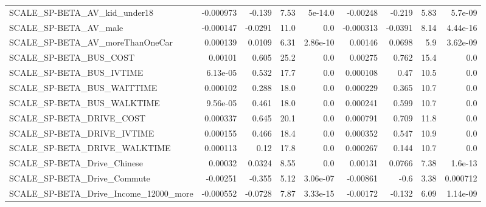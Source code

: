 \begin{tabular}{lrrrrrrrr}
SCALE\_SP-BETA\_AV\_kid\_under18                       &   -0.000973 &       -0.139 &     7.53 &  5e-14.0 &   -0.00248 &      -0.219 &         5.83 &       5.7e-09 \\
SCALE\_SP-BETA\_AV\_male                              &   -0.000147 &      -0.0291 &     11.0 &      0.0 &  -0.000313 &     -0.0391 &         8.14 &      4.44e-16 \\
SCALE\_SP-BETA\_AV\_moreThanOneCar                    &    0.000139 &       0.0109 &     6.31 & 2.86e-10 &    0.00146 &      0.0698 &          5.9 &      3.62e-09 \\
SCALE\_SP-BETA\_BUS\_COST                             &     0.00101 &        0.605 &     25.2 &      0.0 &    0.00275 &       0.762 &         15.4 &           0.0 \\
SCALE\_SP-BETA\_BUS\_IVTIME                           &    6.13e-05 &        0.532 &     17.7 &      0.0 &   0.000108 &        0.47 &         10.5 &           0.0 \\
SCALE\_SP-BETA\_BUS\_WAITTIME                         &    0.000102 &        0.288 &     18.0 &      0.0 &   0.000229 &       0.365 &         10.7 &           0.0 \\
SCALE\_SP-BETA\_BUS\_WALKTIME                         &    9.56e-05 &        0.461 &     18.0 &      0.0 &   0.000241 &       0.599 &         10.7 &           0.0 \\
SCALE\_SP-BETA\_DRIVE\_COST                           &    0.000337 &        0.645 &     20.1 &      0.0 &   0.000791 &       0.709 &         11.8 &           0.0 \\
SCALE\_SP-BETA\_DRIVE\_IVTIME                         &    0.000155 &        0.466 &     18.4 &      0.0 &   0.000352 &       0.547 &         10.9 &           0.0 \\
SCALE\_SP-BETA\_DRIVE\_WALKTIME                       &    0.000113 &         0.12 &     17.8 &      0.0 &   0.000267 &       0.144 &         10.7 &           0.0 \\
SCALE\_SP-BETA\_Drive\_Chinese                        &     0.00032 &       0.0324 &     8.55 &      0.0 &    0.00131 &      0.0766 &         7.38 &       1.6e-13 \\
SCALE\_SP-BETA\_Drive\_Commute                        &    -0.00251 &       -0.355 &     5.12 & 3.06e-07 &   -0.00861 &        -0.6 &         3.38 &      0.000712 \\
SCALE\_SP-BETA\_Drive\_Income\_12000\_more              &   -0.000552 &      -0.0728 &     7.87 & 3.33e-15 &   -0.00172 &      -0.132 &         6.09 &      1.14e-09 \\

\end{tabular}
